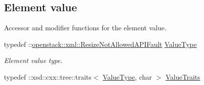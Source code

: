\subsection*{Element value}
\label{_amgrp2ee2eae1a8c390ea033f241c027da8d6}
Accessor and modifier functions for the element value. \begin{DoxyCompactItemize}
\item 
\hypertarget{classopenstack_1_1xml_1_1ResizeNotAllowed_a42fa8ab72b9944bb6f04141437b54c2e}{
typedef ::\hyperlink{classopenstack_1_1xml_1_1ResizeNotAllowedAPIFault}{openstack::xml::ResizeNotAllowedAPIFault} \hyperlink{classopenstack_1_1xml_1_1ResizeNotAllowed_a42fa8ab72b9944bb6f04141437b54c2e}{ValueType}}
\label{classopenstack_1_1xml_1_1ResizeNotAllowed_a42fa8ab72b9944bb6f04141437b54c2e}

\begin{DoxyCompactList}\small\item\em Element value type. \item\end{DoxyCompactList}\item 
\hypertarget{classopenstack_1_1xml_1_1ResizeNotAllowed_a8903814e63784115c6b708f4e8a94d6e}{
typedef ::xsd::cxx::tree::traits$<$ \hyperlink{classopenstack_1_1xml_1_1ResizeNotAllowedAPIFault}{ValueType}, char $>$ \hyperlink{classopenstack_1_1xml_1_1ResizeNotAllowed_a8903814e63784115c6b708f4e8a94d6e}{ValueTraits}}
\label{classopenstack_1_1xml_1_1ResizeNotAllowed_a8903814e63784115c6b708f4e8a94d6e}


\end{DoxyCompactItemize}
